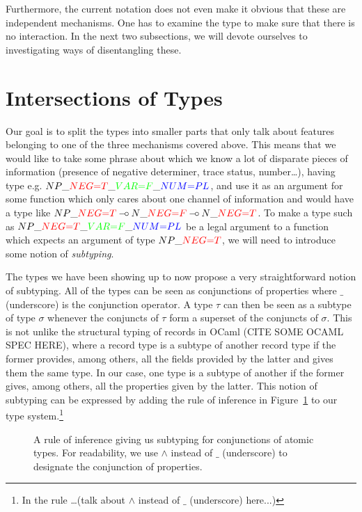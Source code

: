 Furthermore, the current notation does not even make it obvious that
these are independent mechanisms. One has to examine the type to make
sure that there is no interaction. In the next two subsections, we will
devote ourselves to investigating ways of disentangling these.


\section{Intersections of Types}

Our goal is to split the types into smaller parts that only talk about
features belonging to one of the three mechanisms covered above. This
means that we would like to take some phrase about which we know a lot
of disparate pieces of information (presence of negative determiner,
trace status, number\ldots), having type
e.g. $NP\_\textcolor{red}{NEG{=}T}\_\textcolor{green}{VAR{=}F}\_\textcolor{blue}{NUM{=}PL}$,
and use it as an argument for some function which only cares about one
channel of information and would have a type like
$NP\_\textcolor{red}{NEG{=}T} \limp N\_\textcolor{red}{NEG{=}F} \limp
N\_\textcolor{red}{NEG{=}T}$. To make a type such as
$NP\_\textcolor{red}{NEG{=}T}\_\textcolor{green}{VAR{=}F}\_\textcolor{blue}{NUM{=}PL}$
be a legal argument to a function which expects an argument of type
$NP\_\textcolor{red}{NEG{=}T}$, we will need to introduce some notion of
\emph{subtyping}.

The types we have been showing up to now propose a very straightforward
notion of subtyping. All of the types can be seen as conjunctions of
properties where $\_$ (underscore) is the conjunction operator. A type
$\tau$ can then be seen as a subtype of type $\sigma$ whenever the
conjuncts of $\tau$ form a superset of the conjuncts of $\sigma$. This
is not unlike the structural typing of records in OCaml (CITE SOME OCAML
SPEC HERE), where a record type is a subtype of another record type if
the former provides, among others, all the fields provided by the latter
and gives them the same type. In our case, one type is a subtype of
another if the former gives, among others, all the properties given by
the latter. This notion of subtyping can be expressed by adding the rule
of inference in Figure~\ref{fig:type-superset} to our type
system.\footnote{In the rule \ldots (talk about $\land$ instead of $\_$
  (underscore) here...)}

\begin{figure}
  \begin{prooftree}
  \end{prooftree}
  \caption{\label{fig:type-superset} A rule of inference giving us
    subtyping for conjunctions of atomic types. For readability, we use
    $\land$ instead of $\_$ (underscore) to designate the conjunction of
    properties.}
\end{figure}

